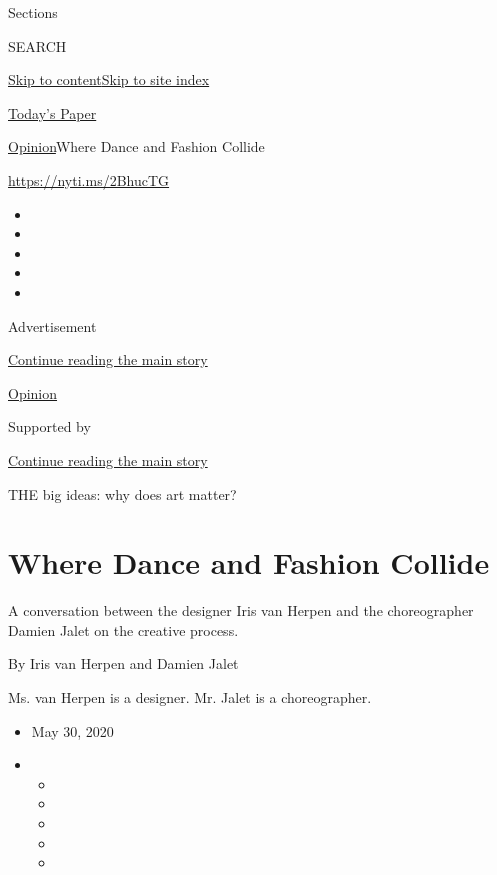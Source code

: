 Sections

SEARCH

\protect\hyperlink{site-content}{Skip to
content}\protect\hyperlink{site-index}{Skip to site index}

\href{https://myaccount.nytimes3xbfgragh.onion/auth/login?response_type=cookie\&client_id=vi}{}

\href{https://www.nytimes3xbfgragh.onion/section/todayspaper}{Today's
Paper}

\href{/section/opinion}{Opinion}\textbar{}Where Dance and Fashion
Collide

\url{https://nyti.ms/2BhucTG}

\begin{itemize}
\item
\item
\item
\item
\item
\end{itemize}

Advertisement

\protect\hyperlink{after-top}{Continue reading the main story}

\href{/section/opinion}{Opinion}

Supported by

\protect\hyperlink{after-sponsor}{Continue reading the main story}

THE big ideas: why does art matter?

\hypertarget{where-dance-and-fashion-collide}{%
\section{Where Dance and Fashion
Collide}\label{where-dance-and-fashion-collide}}

A conversation between the designer Iris van Herpen and the
choreographer Damien Jalet on the creative process.

By Iris van Herpen and Damien Jalet

Ms. van Herpen is a designer. Mr. Jalet is a choreographer.

\begin{itemize}
\item
  May 30, 2020
\item
  \begin{itemize}
  \item
  \item
  \item
  \item
  \item
  \end{itemize}
\end{itemize}

